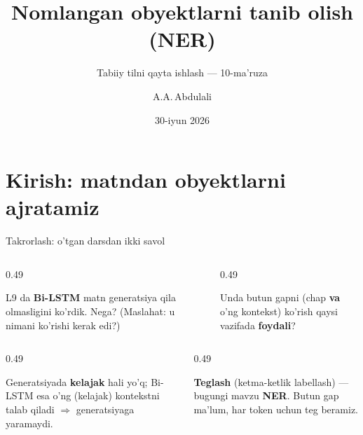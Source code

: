 \documentclass[aspectratio=169,11pt]{beamer}
\title[NER]{Nomlangan obyektlarni tanib olish (NER)}
\subtitle{Tabiiy tilni qayta ishlash --- 10-ma'ruza}
\author[A.A.\,Abdulali]{A.A.\,Abdulali}
\date{30-iyun 2026}
\institute{11:00--12:20 \quad$\cdot$\quad mavzu \textnumero{}10}
\begin{document}

\maketitle

\section[Kirish]{Kirish: matndan obyektlarni ajratamiz}

\begin{frame}{Takrorlash: o'tgan darsdan ikki savol}
  \begin{columns}[T]
    \begin{column}{0.49\textwidth}
      \begin{tcolorbox}[warnbox,title=1-savol]
        \small
        L9 da \textbf{Bi-LSTM} matn generatsiya qila olmasligini ko'rdik. Nega?
        (Maslahat: u nimani ko'rishi kerak edi?)
      \end{tcolorbox}
    \end{column}
    \begin{column}{0.49\textwidth}
      \begin{tcolorbox}[warnbox,title=2-savol]
        \small
        Unda butun gapni (chap \textbf{va} o'ng kontekst) ko'rish qaysi vazifada
        \textbf{foydali}?
      \end{tcolorbox}
    \end{column}
  \end{columns}
  \pause
  \vspace{4pt}
  \begin{columns}[T]
    \begin{column}{0.49\textwidth}
      \begin{tcolorbox}[okbox,title=1-javob]
        \small
        Generatsiyada \textbf{kelajak} hali yo'q; Bi-LSTM esa o'ng (kelajak)
        kontekstni talab qiladi $\Rightarrow$ generatsiyaga yaramaydi.
      \end{tcolorbox}
    \end{column}
    \begin{column}{0.49\textwidth}
      \begin{tcolorbox}[okbox,title=2-javob]
        \small
        \textbf{Teglash} (ketma-ketlik labellash) --- bugungi mavzu \textbf{NER}.
        Butun gap ma'lum, har token uchun teg beramiz.
      \end{tcolorbox}
    \end{column}
  \end{columns}
\end{frame}
\end{document}
